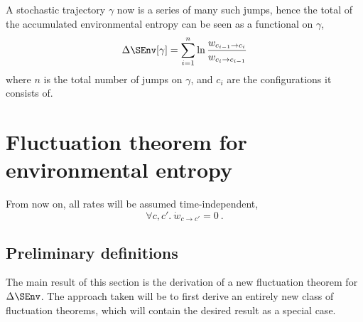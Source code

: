 A stochastic trajectory \(\gamma\) now is a series of many such jumps, hence the total of the accumulated environmental entropy can be seen as a functional on \(\gamma\),
%
\begin{align}
	\label{eqn:SEnv rate jump functional}
	\Delta\SEnv[\gamma] = \sum_{i=1}^n\ln\frac{w_{c_{i-1}\to c_i}}{w_{c_i\to c_{i-1}}}
\end{align}
%
where \(n\) is the total number of jumps on \(\gamma\), and \(c_i\) are the configurations it consists of.




\section{Fluctuation theorem for environmental entropy}


From now on, all rates will be assumed time-independent,
\begin{equation}
	\forall c, c'.~ \dot w_{c\to c'} = 0 ~.
\end{equation}



\subsection{Preliminary definitions}

The main result of this section is the derivation of a new fluctuation theorem for \(\Delta\SEnv\). The approach taken will be to first derive an entirely new class of fluctuation theorems, which will contain the desired result as a special case.

